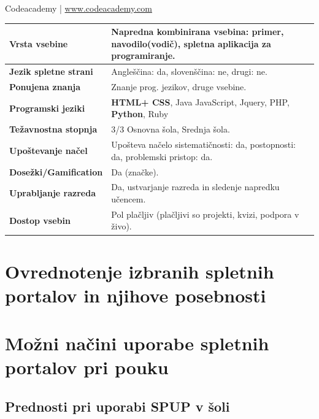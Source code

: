 \begin{osebnabox}[label={osebna:codeacademy}]{Codeacademy | \url{www.codeacademy.com}}
    \begin{tabular}{
  p{} |
  p{}  }
  \textbf{Vrsta vsebine} & \textbf{Napredna kombinirana vsebina}: primer,
                           navodilo(vodič), spletna aplikacija za programiranje.  \\
      \hline
  \textbf{Jezik spletne strani} &  Angleščina: da, slovenščina: ne,
                                  drugi: ne. \\
      \hline
  \textbf{Ponujena znanja} & Znanje prog. jezikov, druge vsebine. \\
      \hline
 \textbf{Programski jeziki} & \textbf{HTML+ CSS}, Java JavaScript, Jquery, PHP,
                              \textbf{Python}, Ruby \\
      \hline
  \textbf{Težavnostna stopnja} & 3/3 Osnovna šola, Srednja šola. \\
      \hline
   \textbf{Upoštevanje načel} & Upošteva načelo sistematičnosti: da,
      postopnosti: da, problemski pristop: da. \\
      \hline
  \textbf{Dosežki/Gamification} & Da (značke). \\
      \hline
  \textbf{Uprabljanje razreda} &Da, ustvarjanje razreda in sledenje
                                 napredku učencem. \\
      \hline
  \textbf{Dostop vsebin} & Pol plačljiv (plačljivi so projekti, kvizi,
                           podpora v živo). \\
\end{tabular}
\end{osebnabox}

\section{Ovrednotenje izbranih spletnih portalov in njihove posebnosti}
\label{sec:pregled_spletnih_portalov}


\section{Možni načini uporabe spletnih portalov pri pouku}
\label{sec:načini_uporabe_sp}

\subsection{Prednosti pri uporabi SPUP v šoli }
\label{sec:Prednosti_pri_uporavi_SPUP}

